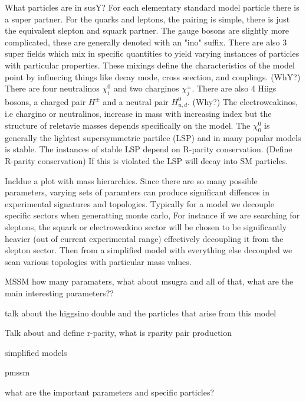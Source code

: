What particles are in susY?
For each elementary standard model particle there is a super partner. For the quarks and leptons, the pairing is simple, there is just the equivalent slepton and squark partner. The gauge bosons are slightly more complicated, these are generally denoted with an "ino" suffix. There are also 3 super fields which mix in specific quantities to yield varying instances of particles with particular properties. These mixings define the characteristics of the model point by influecing things like decay mode, cross seection, and couplings.  (WhY?) There are four neutralinos $\chi^0_i$ and two charginos $\chi^\pm_j$. There are also 4 Hiigs bosons, a charged pair $H^\pm$ and a neutral pair $H^0_{u,d}$. (Why?)  The electroweakinos, i.e chargino or neutralinos, increase in mass with increasing index but the structure of reletavie masses depends specifically on the model. The $\chi^0_0$ is generally the lightest supersymmetric partilce (LSP) and in many popular models is stable. The instances of stable LSP depend on R-parity conservation. (Define R-parity conservation) If this is violated the LSP will decay into SM particles.



Incldue a plot with mass hierarchies. Since there are so many possible parameters, varying sets of paramters can produce significant diffences in experimental signatures and topologies. Typically for a model we decouple specific sectors when generatting monte carlo, For instance if we are searching for sleptons, the squark or electroweakino sector will be chosen to be significantly heavier (out of current experimental range) effectively decoupling it from the slepton sector. Then from a simplified model with everything else decoupled we scan various topologies with particular mass values. 

MSSM how many paramaters, what about msugra and all of that, what are the main interesting parameters??


talk about the higgsino double and the particles that arise from this model

Talk about and define r-parity, what is rparity pair production


simplified models

pmssm

what are the important parameters and specific particles?
